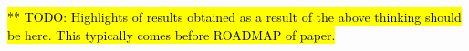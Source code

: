 %
%

%
%
%

%
%
%
%

%
%
%
\hl{**   TODO: 
Highlights of results obtained as a result of the above thinking should be here. This typically comes before ROADMAP of paper.}

